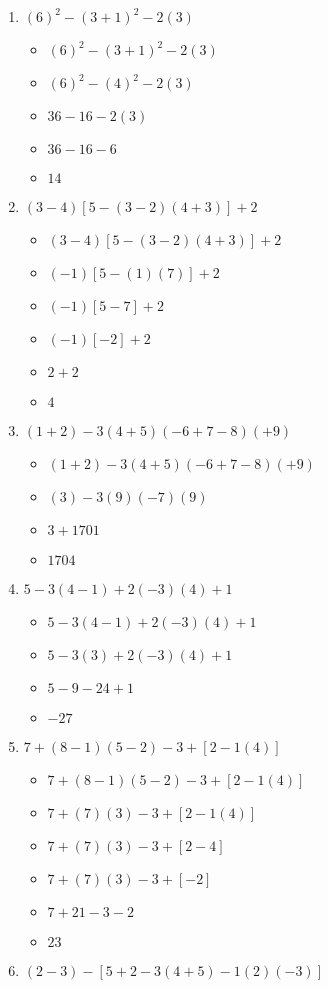 \documentclass{article}
\begin{document}
\begin{enumerate}
\item $(6)^{2}-(3+1)^{2}-2(3)$
  \begin{itemize}
  \item $(6)^{2}-(3+1)^{2}-2(3)$
  \item $(6)^{2}-(4)^{2}-2(3)$
  \item $36-16-2(3)$
  \item $36-16-6$
  \item $14$
  \end{itemize}
\item $(3-4)[5-(3-2)(4+3)]+2$
  \begin{itemize}
  \item $(3-4)[5-(3-2)(4+3)]+2$
  \item $(-1)[5-(1)(7)]+2$
  \item $(-1)[5-7]+2$
  \item $(-1)[-2]+2$
  \item $2+2$
  \item $4$
  \end{itemize}
\item $(1+2)-3(4+5)(-6+7-8)(+9)$
  \begin{itemize}
  \item $(1+2)-3(4+5)(-6+7-8)(+9)$
  \item $(3)-3(9)(-7)(9)$
  \item $3+1701$
  \item $1704$
  \end{itemize}
\item $5-3(4-1)+2(-3)(4)+1$
  \begin{itemize}
  \item $5-3(4-1)+2(-3)(4)+1$
  \item $5-3(3)+2(-3)(4)+1$
  \item $5-9-24+1$
  \item $-27$
  \end{itemize}
\item $7+(8-1)(5-2)-3+[2-1(4)]$
  \begin{itemize}
  \item $7+(8-1)(5-2)-3+[2-1(4)]$
  \item $7+(7)(3)-3+[2-1(4)]$
  \item $7+(7)(3)-3+[2-4]$
  \item $7+(7)(3)-3+[-2]$
  \item $7+21-3-2$
  \item $23$
  \end{itemize}
\item $(2-3)-[5+2-3(4+5)-1(2)(-3)]$

\end{enumerate}
\end{document}
